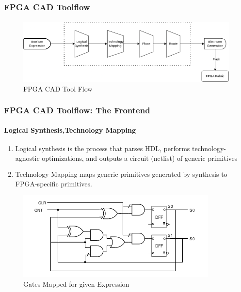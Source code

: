 \documentclass{beamer}
\begin{document}
\begin{frame}[fragile]
  \frametitle{FPGA CAD Toolflow}
  \framesubtitle{}
   \begin{figure}
        \centering
        \includegraphics[width=1\linewidth]{images/cad_flow_fl.png}
        \caption{FPGA CAD Tool Flow }
        \label{exa_cadflow}
    \end{figure}
   
\end{frame}

\begin{frame}[fragile]
    \frametitle{FPGA CAD Toolflow: The Frontend}
    \framesubtitle{Logical Synthesis,Technology Mapping}
    \begin{enumerate}
      \item Logical synthesis is the process that parses HDL, performs
        technology-agnostic optimizations, and outputs a circuit (netlist)
        of generic primitives
      \item Technology Mapping maps generic primitives generated by synthesis to
        FPGA-specific primitives. 
    \end{enumerate}
    \begin{figure}
        \includegraphics[width=0.5\linewidth]{images/netlist_gate.png}
        \caption{Gates Mapped for given Expression}
        \label{exa_mapgate}
    \end{figure}

\end{frame}
\end{document}
